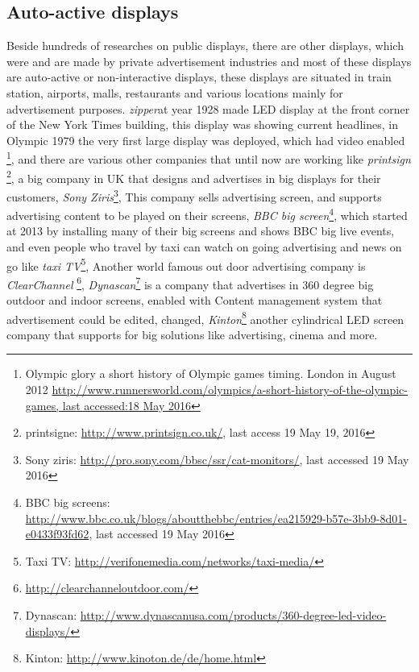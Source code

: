 \subsection{Auto-active displays}
Beside hundreds of researches on public displays, there are other displays, which were and are made by private advertisement industries and most of these displays are auto-active or non-interactive displays, these displays are situated in train station, airports, malls, restaurants and various locations mainly for advertisement purposes. \emph{zipper}\cite{zipper}at year 1928 made LED display at the front corner of the New York Times building, this display was showing current headlines, in Olympic 1979 the very first large display was deployed, which had video enabled \footnote{Olympic glory a short history of Olympic games timing. London in August 2012 \url{http://www.runnersworld.com/olympics/a-short-history-of-the-olympic-games, last accessed:18 May 2016}}, and there are various other companies that until now are working like \emph{printsign} \footnote{printsigne: \url{http://www.printsign.co.uk/}, last access 19 May 19, 2016}, a big company in UK that designs and advertises in big displays for their customers, \emph{Sony Ziris}\footnote{Sony ziris: \url{http://pro.sony.com/bbsc/ssr/cat-monitors/}, last accessed 19 May 2016}, This company sells advertising screen, and supports advertising content to be played on their screens, \emph{BBC big screen}\footnote{BBC big screens: \url{http://www.bbc.co.uk/blogs/aboutthebbc/entries/ea215929-b57e-3bb9-8d01-e0433f93fd62}, last accessed 19 May 2016}, which started at 2013 by installing many of their big screens and shows BBC big live events, and even people who travel by taxi can watch on going advertising and news on go like \emph{taxi TV}\footnote{Taxi TV: \url{http://verifonemedia.com/networks/taxi-media/}}, Another world famous out door advertising company is \emph{ClearChannel} \footnote{\url{http://clearchanneloutdoor.com/}}, \emph{Dynascan}\footnote{ Dynascan: \url{http://www.dynascanusa.com/products/360-degree-led-video-displays/}} is a company that advertises in 360 degree big outdoor and indoor screens, enabled with Content management system that advertisement could be edited, changed,  \emph{Kinton}\footnote{Kinton: \url{http://www.kinoton.de/de/home.html}} another cylindrical LED screen company that supports for big solutions like advertising, cinema and more. 


